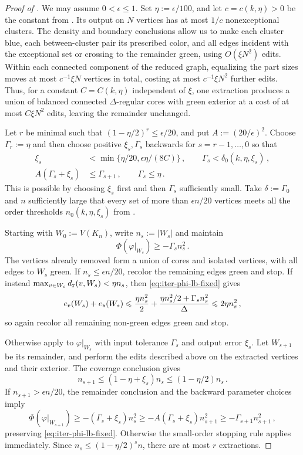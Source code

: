 \begin{proof}[Proof of ]
We may assume $0<\epsilon\leq1$. Set $\eta:=\epsilon/100$, and let $c=c(k,\eta)>0$ be the constant from . Its output on $N$ vertices has at most $1/c$ nonexceptional clusters. The density and boundary conclusions allow us to make each cluster blue, each between-cluster pair its prescribed color, and all edges incident with the exceptional set or crossing to the remainder green, using $O(\xi N^2)$ edits. Within each connected component of the reduced graph, equalizing the part sizes moves at most $c^{-1}\xi N$ vertices in total, costing at most $c^{-1}\xi N^2$ further edits. Thus, for a constant $C=C(k,\eta)$ independent of $\xi$, one extraction produces a union of balanced connected $\Delta$-regular cores with green exterior at a cost of at most $C\xi N^2$ edits, leaving the remainder unchanged.

Let $r$ be minimal such that $(1-\eta/2)^r\leq\epsilon/20$, and put $A:=(20/\epsilon)^2$. Choose $\Gamma_r:=\eta$ and then choose positive $\xi_s,\Gamma_s$ backwards for $s=r-1,\dots,0$ so that
\begin{align*}
\xi_s&<\min\{\eta/20,\epsilon\eta/(8C)\}\,,\qquad \Gamma_s<\delta_0(k,\eta,\xi_s)\,,\\
A(\Gamma_s+\xi_s)&\leq\Gamma_{s+1}\,,\qquad\Gamma_s\leq\eta\,.
\end{align*}
This is possible by choosing $\xi_s$ first and then $\Gamma_s$ sufficiently small. Take $\delta:=\Gamma_0$ and $n$ sufficiently large that every set of more than $\epsilon n/20$ vertices meets all the order thresholds $n_0(k,\eta,\xi_s)$ from .

Starting with $W_0:=V(K_n)$, write $n_s:=|W_s|$ and maintain
\begin{equation}\label{eq:iter-phi-lb-fixed}
\Phi(\varphi|_{W_s})\geq-\Gamma_s n_s^2\,.
\end{equation}
The vertices already removed form a union of cores and isolated vertices, with all edges to $W_s$ green. If $n_s\leq\epsilon n/20$, recolor the remaining edges green and stop. If instead $\max_{v\in W_s}d_{\normalfont\texttt r}(v,W_s)<\eta n_s$, then \eqref{eq:iter-phi-lb-fixed} gives
$$e_{\normalfont\texttt r}(W_s)+e_{\normalfont\texttt b}(W_s)\leqslant\frac{\eta n_s^2}{2}+\frac{\eta n_s^2/2+\Gamma_s n_s^2}{\Delta}\leqslant2\eta n_s^2\,,$$
so again recolor all remaining non-green edges green and stop.

Otherwise apply  to $\varphi|_{W_s}$ with input tolerance $\Gamma_s$ and output error $\xi_s$. Let $W_{s+1}$ be its remainder, and perform the edits described above on the extracted vertices and their exterior. The coverage conclusion gives
$$n_{s+1}\leq(1-\eta+\xi_s)n_s\leq(1-\eta/2)n_s\,.$$
If $n_{s+1}>\epsilon n/20$, the remainder conclusion and the backward parameter choices imply
$$\Phi(\varphi|_{W_{s+1}})\geq-(\Gamma_s+\xi_s)n_s^2\geq-A(\Gamma_s+\xi_s)n_{s+1}^2\geq-\Gamma_{s+1}n_{s+1}^2\,,$$
preserving \eqref{eq:iter-phi-lb-fixed}. Otherwise the small-order stopping rule applies immediately. Since $n_s\leq(1-\eta/2)^s n$, there are at most $r$ extractions.


\end{proof}
